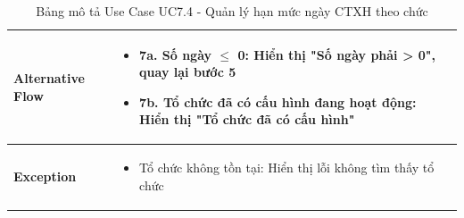 \begin{table}[H]
\begin{tabular}{|m{}|m{}|}
    \textbf{Alternative Flow} 
    & \begin{itemize}
        \item \textbf{7a.} Số ngày $\leq$ 0: Hiển thị "Số ngày phải > 0", quay lại bước 5
        \item \textbf{7b.} Tổ chức đã có cấu hình đang hoạt động: Hiển thị "Tổ chức đã có cấu hình"
    \end{itemize}
    \\ \hline

    \textbf{Exception} 
    & \begin{itemize}
        \item Tổ chức không tồn tại: Hiển thị lỗi không tìm thấy tổ chức
    \end{itemize}
    \\ \hline
    \end{tabular}
    \caption{Bảng mô tả Use Case UC7.4 - Quản lý hạn mức ngày CTXH theo chức}
    \end{table}

